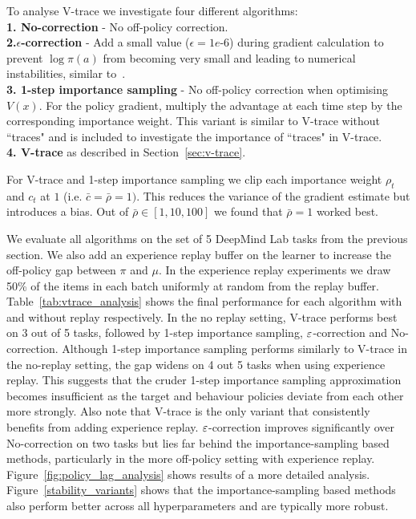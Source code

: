 To analyse V-trace we investigate four different algorithms:\\
    \textbf{1. No-correction} - No off-policy correction.\\
    \textbf{2.\hspace{.1cm}$\epsilon$-correction} - Add a small value ($\epsilon = 1e\mbox{-}6$) during gradient calculation to prevent $\log \pi(a)$ from becoming very small and leading to numerical instabilities, similar to~\cite{babaeizadeh2016ga3c}.\\
    \textbf{3. 1-step importance sampling} - No off-policy correction when optimising $V(x)$. For the policy gradient, multiply the advantage at each time step by the corresponding importance weight. This variant is similar to V-trace without ``traces" and is included to investigate the importance of ``traces" in V-trace.\\
    \textbf{4. V-trace} as described in Section~\ref{sec:v-trace}.

For V-trace and 1-step importance sampling we clip each importance weight $\rho_t$ and $c_t$ at $1$ (i.e. $\bar c = \bar \rho = 1)$. This reduces the variance of the gradient estimate but introduces a bias. Out of $\bar\rho\in [1, 10, 100]$ we found that $\bar\rho = 1$ worked best.

We evaluate all algorithms on the set of 5 DeepMind Lab tasks from the previous section. We also add an experience replay buffer on the learner to increase the off-policy gap between $\pi$ and $\mu$. In the experience replay experiments we draw 50\% of the items in each batch uniformly at random from the replay buffer.
Table~\ref{tab:vtrace_analysis} shows the final performance for each algorithm with and without replay respectively. In the no replay setting, V-trace performs best on 3 out of 5 tasks, followed by 1-step importance sampling, $\varepsilon$-correction and No-correction.
Although 1-step importance sampling performs similarly to V-trace in the no-replay setting, the gap widens on 4 out 5 tasks when using experience replay. This suggests that the cruder 1-step importance sampling approximation becomes insufficient as the target and behaviour policies deviate from each other more strongly. Also note that V-trace is the only variant that consistently benefits from adding experience replay.
$\varepsilon$-correction improves significantly over No-correction on two tasks but lies far behind the importance-sampling based methods, particularly in the more off-policy setting with experience replay. Figure~\ref{fig:policy_lag_analysis}
shows results of a more detailed analysis.
Figure~\ref{stability_variants}
shows that the importance-sampling based methods also perform better across all hyperparameters and are typically more robust.


